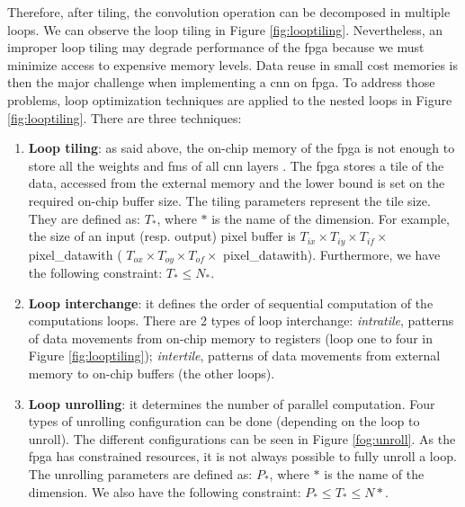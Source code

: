 Therefore, after tiling, the convolution operation can be decomposed in multiple loops. We can observe the loop tiling in Figure \ref{fig:looptiling}. Nevertheless, an improper loop tiling may degrade performance of the \acrshort{fpga} because we must minimize access to expensive memory levels. Data reuse in small cost memories is then the major challenge when implementing a \acrshort{cnn} on \acrshort{fpga}. To address those problems, loop optimization techniques are applied to the nested loops in Figure \ref{fig:looptiling}. There are three techniques:
%
\begin{enumerate}
    \item \textbf{Loop tiling}: as said above, the on-chip memory of the \acrshort{fpga} is not enough to store all the weights and \acrshort{fm}s of all \acrshort{cnn} layers \cite{abdelouahab_accelerating_2018}. The \acrshort{fpga} stores a tile of the data, accessed from the external memory and the lower bound is set on the required on-chip buffer size. The tiling parameters represent the tile size. They are defined as: $T_{*}$, where $*$ is the name of the dimension. For example, the size of an input (resp. output) pixel buffer is $T_{ix} \times T_{iy} \times T_{if} \times $ pixel\_datawith ( $ T_{ox} \times T_{oy} \times T_{of} \times $ pixel\_datawith). Furthermore, we have the following constraint: $T_{*} \leq N_{*}$.
    \item \textbf{Loop interchange}: it defines the order of sequential computation of the computations loops. There are 2 types of loop interchange: \textit{intratile}, patterns of data movements from on-chip memory to registers (loop one to four in Figure \ref{fig:looptiling}); \textit{intertile}, patterns of data movements from external memory to on-chip buffers (the other loops).
    \item \textbf{Loop unrolling}: it determines the number of parallel computation. Four types of unrolling configuration can be done (depending on the loop to unroll). The different configurations can be seen in Figure \ref{fog:unroll}. As the \acrshort{fpga} has constrained resources, it is not always possible to fully unroll a loop. The unrolling parameters are defined as: $P_{*}$, where $*$ is the name of the dimension. We also have the following constraint: $P_{*} \leq T_{*} \leq N{*}$.
\end{enumerate}
%
